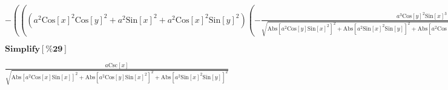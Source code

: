 \documentclass{article}
\begin{document}
\begin{doublespace}
\noindent\(-\left(\left(\left(a^2 \text{Cos}[x]^2 \text{Cos}[y]^2+a^2 \text{Sin}[x]^2+a^2 \text{Cos}[x]^2 \text{Sin}[y]^2\right) \left(-\frac{a^3
\text{Cos}[y]^2 \text{Sin}[x]^3}{\sqrt{\text{Abs}\left[a^2 \text{Cos}[y] \text{Sin}[x]^2\right]^2+\text{Abs}\left[a^2 \text{Sin}[x]^2 \text{Sin}[y]\right]^2+\text{Abs}\left[a^2
\text{Cos}[x] \text{Cos}[y]^2 \text{Sin}[x]+a^2 \text{Cos}[x] \text{Sin}[x] \text{Sin}[y]^2\right]^2}}-\frac{a^3 \text{Sin}[x]^3 \text{Sin}[y]^2}{\sqrt{\text{Abs}\left[a^2
\text{Cos}[y] \text{Sin}[x]^2\right]^2+\text{Abs}\left[a^2 \text{Sin}[x]^2 \text{Sin}[y]\right]^2+\text{Abs}\left[a^2 \text{Cos}[x] \text{Cos}[y]^2
\text{Sin}[x]+a^2 \text{Cos}[x] \text{Sin}[x] \text{Sin}[y]^2\right]^2}}\right)+\left(a^2 \text{Cos}[y]^2 \text{Sin}[x]^2+a^2 \text{Sin}[x]^2 \text{Sin}[y]^2\right)
\left(-\frac{a^3 \text{Cos}[y]^2 \text{Sin}[x]^3}{\sqrt{\text{Abs}\left[a^2 \text{Cos}[y] \text{Sin}[x]^2\right]^2+\text{Abs}\left[a^2 \text{Sin}[x]^2
\text{Sin}[y]\right]^2+\text{Abs}\left[a^2 \text{Cos}[x] \text{Cos}[y]^2 \text{Sin}[x]+a^2 \text{Cos}[x] \text{Sin}[x] \text{Sin}[y]^2\right]^2}}-\frac{a^3
\text{Sin}[x]^3 \text{Sin}[y]^2}{\sqrt{\text{Abs}\left[a^2 \text{Cos}[y] \text{Sin}[x]^2\right]^2+\text{Abs}\left[a^2 \text{Sin}[x]^2 \text{Sin}[y]\right]^2+\text{Abs}\left[a^2
\text{Cos}[x] \text{Cos}[y]^2 \text{Sin}[x]+a^2 \text{Cos}[x] \text{Sin}[x] \text{Sin}[y]^2\right]^2}}-\frac{a \text{Cos}[x] \left(a^2 \text{Cos}[x]
\text{Cos}[y]^2 \text{Sin}[x]+a^2 \text{Cos}[x] \text{Sin}[x] \text{Sin}[y]^2\right)}{\sqrt{\text{Abs}\left[a^2 \text{Cos}[y] \text{Sin}[x]^2\right]^2+\text{Abs}\left[a^2
\text{Sin}[x]^2 \text{Sin}[y]\right]^2+\text{Abs}\left[a^2 \text{Cos}[x] \text{Cos}[y]^2 \text{Sin}[x]+a^2 \text{Cos}[x] \text{Sin}[x] \text{Sin}[y]^2\right]^2}}\right)\right)/\left(2
\left(a^2 \text{Cos}[y]^2 \text{Sin}[x]^2+a^2 \text{Sin}[x]^2 \text{Sin}[y]^2\right)^2\right)\right)\)
\end{doublespace}

\begin{doublespace}
\noindent\(\pmb{\text{Simplify}[\text{$\%$29}]}\)
\end{doublespace}

\begin{doublespace}
\noindent\(\frac{a \text{Csc}[x]}{\sqrt{\text{Abs}\left[a^2 \text{Cos}[x] \text{Sin}[x]\right]^2+\text{Abs}\left[a^2 \text{Cos}[y] \text{Sin}[x]^2\right]^2+\text{Abs}\left[a^2
\text{Sin}[x]^2 \text{Sin}[y]\right]^2}}\)
\end{doublespace}
\end{document}
